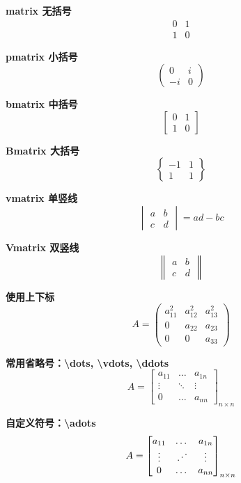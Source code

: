 \documentclass{ctexart}
\newcommand{\adots}{\mathinner{\mkern2mu\raisebox{0.1em}{.}\mkern2mu\raisebox{0.4em}{.}\mkern2mu\raisebox{0.7em}{.}\mkern1mu}}
\begin{document}
    \textbf{matrix 无括号}
    \[
   \begin{matrix}
       0 & 1\\
       1 & 0
   \end{matrix} 
   \]

   \textbf{pmatrix 小括号}
   \[
   \begin{pmatrix}
       0 & i\\
       -i & 0
   \end{pmatrix} 
   \]

   \textbf{bmatrix 中括号}
   \[
   \begin{bmatrix}
       0 & 1\\
       1 & 0
   \end{bmatrix} 
   \]

   \textbf{Bmatrix 大括号}
   \[
   \begin{Bmatrix}
       -1 & 1\\
       1 & 1
   \end{Bmatrix} 
   \]

   \textbf{vmatrix 单竖线}
   \[
    \begin{vmatrix}
        a & b\\
        c & d
    \end{vmatrix} = ad-bc
    \]

    \textbf{Vmatrix 双竖线}
   \[
    \begin{Vmatrix}
        a & b\\
        c & d
    \end{Vmatrix} 
    \]


    \textbf{使用上下标}
    \[
   A=\begin{pmatrix}
       a_{11}^2 & a_{12}^2 & a_{13}^2\\
       0 & a_{22} & a_{23}\\
       0 & 0 & a_{33}
   \end{pmatrix} 
   \]

   \textbf{常用省略号：\textbackslash dots, \textbackslash vdots, \textbackslash ddots}
   \[
   A=\begin{bmatrix}
       a_{11} & \dots & a_{1n}\\
       \vdots & \ddots & \vdots \\
       0 & \dots & a_{nn}
   \end{bmatrix}_{n \times n}
   \]

   \textbf{自定义符号：\textbackslash adots}
   \[
   A=\begin{bmatrix}
       a_{11} & \dots & a_{1n}\\
       \vdots & \adots & \vdots \\
       0 & \dots & a_{nn}
   \end{bmatrix}_{n \times n}
   \]
\end{document}
